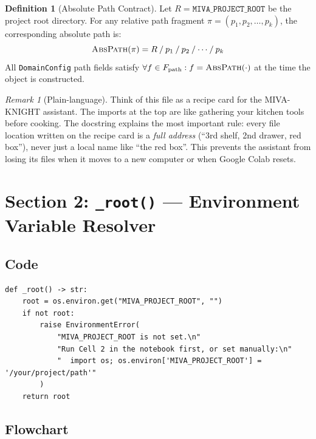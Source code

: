\documentclass[12pt,a4paper]{article}
\theoremstyle{definition}
\newtheorem{definition}[theorem]{Definition}
\theoremstyle{remark}
\newtheorem{remark}[theorem]{Remark}
\begin{document}
\begin{definition}[Absolute Path Contract]
Let $R = \texttt{MIVA\_PROJECT\_ROOT}$ be the project root directory.
For any relative path fragment $\pi = (p_1, p_2, \ldots, p_k)$, the
corresponding absolute path is:
\[
  \textsc{AbsPath}(\pi) = R \mathbin{/} p_1 \mathbin{/} p_2 \mathbin{/}
  \cdots \mathbin{/} p_k
\]
All \texttt{DomainConfig} path fields satisfy
$\forall f \in F_{\text{path}}: f = \textsc{AbsPath}(\cdot)$
at the time the object is constructed.
\end{definition}

\begin{remark}[Plain-language]
Think of this file as a recipe card for the MIVA-KNIGHT assistant.
The imports at the top are like gathering your kitchen tools before cooking.
The docstring explains the most important rule: every file location written
on the recipe card is a \emph{full address} (``3rd shelf, 2nd drawer, red box''),
never just a local name like ``the red box''.
This prevents the assistant from losing its files when it moves to a new
computer or when Google Colab resets.
\end{remark}

\section{Section 2: \texttt{\_root()} — Environment Variable Resolver}

\subsection{Code}

\begin{lstlisting}[caption={\texttt{\_root()} function}]
def _root() -> str:
    root = os.environ.get("MIVA_PROJECT_ROOT", "")
    if not root:
        raise EnvironmentError(
            "MIVA_PROJECT_ROOT is not set.\n"
            "Run Cell 2 in the notebook first, or set manually:\n"
            "  import os; os.environ['MIVA_PROJECT_ROOT'] = '/your/project/path'"
        )
    return root
\end{lstlisting}

\subsection{Flowchart}
\end{document}
